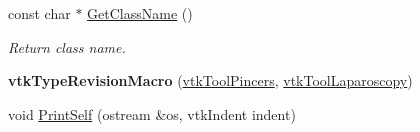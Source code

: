 \begin{DoxyCompactItemize}
\item 
\hypertarget{classvtkToolPincers_a6661419bfbcf7514872938af5a08495a}{
const char $\ast$ \hyperlink{classvtkToolPincers_a6661419bfbcf7514872938af5a08495a}{GetClassName} ()}
\label{classvtkToolPincers_a6661419bfbcf7514872938af5a08495a}

\begin{DoxyCompactList}\small\item\em Return class name. \item\end{DoxyCompactList}\item 
\hypertarget{classvtkToolPincers_a871bfe207f7733755b8912751cf2f58c}{
{\bfseries vtkTypeRevisionMacro} (\hyperlink{classvtkToolPincers}{vtkToolPincers}, \hyperlink{classvtkToolLaparoscopy}{vtkToolLaparoscopy})}
\label{classvtkToolPincers_a871bfe207f7733755b8912751cf2f58c}

\item 
\hypertarget{classvtkToolPincers_a16520112493e44a56045b00a1f65ba34}{
void \hyperlink{classvtkToolPincers_a16520112493e44a56045b00a1f65ba34}{PrintSelf} (ostream \&os, vtkIndent indent)}
\label{classvtkToolPincers_a16520112493e44a56045b00a1f65ba34}


\end{DoxyCompactItemize}
